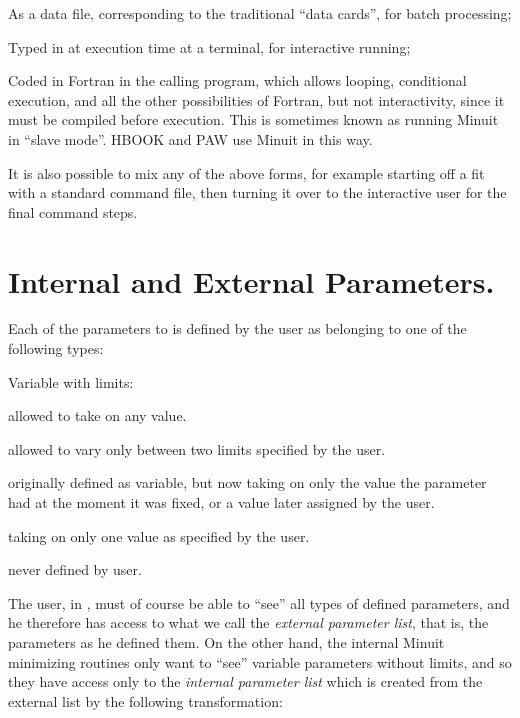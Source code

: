 \begin{UL}
\item As a data file, corresponding to the traditional ``data cards'', for
      batch processing;
\item Typed in at execution time at a terminal, for interactive running;
\item Coded in Fortran in the calling program, which allows looping,
      conditional execution, and all the other possibilities of Fortran, but not
      interactivity, since it must be compiled before execution.
      This is sometimes known as running Minuit in ``slave mode''.
      HBOOK and PAW use Minuit in this way.
\end{UL}

It is also possible to mix any of the above forms, for example starting off
a fit with a standard command file, then turning it over to the interactive
user for the final command steps.

\section{Internal and External Parameters.}

Each of the parameters to  is defined by the user as belonging to
one of the following types:

\begin{DL}{Variable with limits:\ }
\item[Freely variable:]      allowed to take on any value.
\item[Variable with limits:] allowed to vary only between two limits specified by the user.
\item[Fixed:]                originally defined as variable, but now taking on only the
                             value the parameter had at the moment it was fixed, 
                             or a value later assigned by the user.
\item[Constant:]             taking on only one value as specified by the user.
\item[Undefined:]            never defined by user.
\end{DL}
 
The user, in , must of course be able to ``see'' all types of
defined parameters,
and he therefore has access to what we call the
{\it external parameter list}, that is, the parameters as he
defined them.
On the other hand, the internal Minuit minimizing routines only want to ``see''
variable parameters without limits, and so they have access only to the
{\it internal parameter list} which is created from the external list
by the following transformation:

